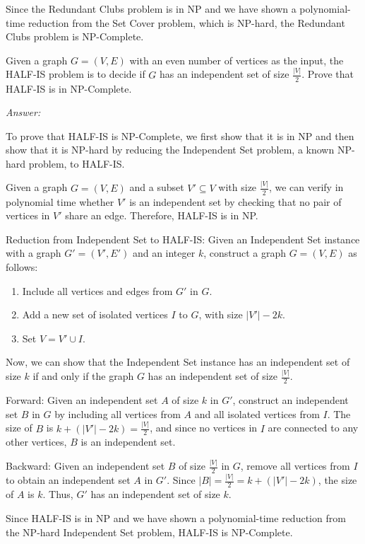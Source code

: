 \documentclass[12pt]{article}
\newenvironment{problem}[2][Problem]{\begin{trivlist}
\item[\hskip \labelsep {\bfseries #1}\hskip \labelsep {\bfseries #2.}]}{\end{trivlist}}
\begin{document}
Since the Redundant Clubs problem is in NP and we have shown a polynomial-time reduction from the Set Cover problem, which is NP-hard, the Redundant Clubs problem is NP-Complete.

\begin{problem}{5}
    Given a graph $G=(V,E)$ with an even number of vertices as the input, the HALF-IS problem is to decide if $G$ has an independent set of size $\frac{|V|}{2}$. Prove that HALF-IS is in NP-Complete.
\end{problem}

\textit{Answer:}

To prove that HALF-IS is NP-Complete, we first show that it is in NP and then show that it is NP-hard by reducing the Independent Set problem, a known NP-hard problem, to HALF-IS.

Given a graph $G=(V,E)$ and a subset $V' \subseteq V$ with size $\frac{|V|}{2}$, we can verify in polynomial time whether $V'$ is an independent set by checking that no pair of vertices in $V'$ share an edge. Therefore, HALF-IS is in NP.

Reduction from Independent Set to HALF-IS: Given an Independent Set instance with a graph $G'=(V',E')$ and an integer $k$, construct a graph $G=(V,E)$ as follows:
\begin{enumerate}
    \item Include all vertices and edges from $G'$ in $G$.
    \item Add a new set of isolated vertices $I$ to $G$, with size $|V'| - 2k$.
    \item Set $V = V' \cup I$.
\end{enumerate}

Now, we can show that the Independent Set instance has an independent set of size $k$ if and only if the graph $G$ has an independent set of size $\frac{|V|}{2}$.

Forward: Given an independent set $A$ of size $k$ in $G'$, construct an independent set $B$ in $G$ by including all vertices from $A$ and all isolated vertices from $I$. The size of $B$ is $k + (|V'| - 2k) = \frac{|V|}{2}$, and since no vertices in $I$ are connected to any other vertices, $B$ is an independent set.

Backward: Given an independent set $B$ of size $\frac{|V|}{2}$ in $G$, remove all vertices from $I$ to obtain an independent set $A$ in $G'$. Since $|B| = \frac{|V|}{2} = k + (|V'| - 2k)$, the size of $A$ is $k$. Thus, $G'$ has an independent set of size $k$.

Since HALF-IS is in NP and we have shown a polynomial-time reduction from the NP-hard Independent Set problem, HALF-IS is NP-Complete.
\end{document}
